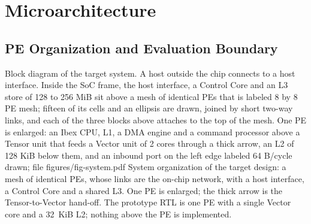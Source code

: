 
\section{Microarchitecture}\label{sec:uarch}

\subsection{PE Organization and Evaluation Boundary}\label{sec:pe-org}

%
  {Block diagram of the target system. A host outside the chip connects to a host interface. Inside the SoC frame, the host interface, a Control Core and an L3 store of 128 to 256 MiB sit above a mesh of identical PEs that is labeled 8 by 8 PE mesh; fifteen of its cells and an ellipsis are drawn, joined by short two-way links, and each of the three blocks above attaches to the top of the mesh. One PE is enlarged: an Ibex CPU, L1, a DMA engine and a command processor above a Tensor unit that feeds a Vector unit of 2 cores through a thick arrow, an L2 of 128 KiB below them, and an inbound port on the left edge labeled 64 B/cycle}%
  {drawn; file figures/fig-system.pdf}%
  {System organization of the target design: a mesh of identical PEs, whose links are the on-chip network, with a host interface, a Control Core and a shared L3. One PE is enlarged; the thick arrow is the Tensor-to-Vector hand-off. The prototype RTL is one PE with a single Vector core and a 32~KiB L2; nothing above the PE is implemented.}

